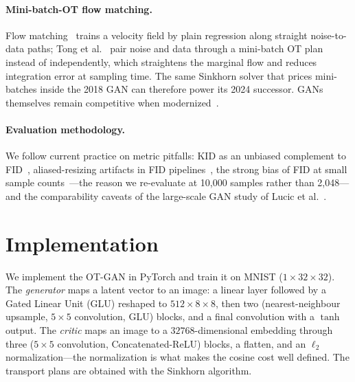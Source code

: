 \documentclass[10pt,twocolumn]{article}
\begin{document}
\paragraph{Mini-batch-OT flow matching.} Flow matching~\cite{lipman2023} trains a
velocity field by plain regression along straight noise-to-data paths; Tong et
al.~\cite{tong2024} pair noise and data through a mini-batch OT plan instead of
independently, which straightens the marginal flow and reduces integration error at
sampling time. The same Sinkhorn solver that prices mini-batches inside the 2018 GAN can
therefore power its 2024 successor. GANs themselves remain competitive when
modernized~\cite{huang2024}.
\paragraph{Evaluation methodology.} We follow current practice on metric pitfalls: KID as
an unbiased complement to FID~\cite{binkowski2018}, aliased-resizing artifacts in FID
pipelines~\cite{parmar2022}, the strong bias of FID at small sample
counts~\cite{chong2020}---the reason we re-evaluate at 10{,}000 samples rather than
2{,}048---and the comparability caveats of the large-scale GAN study of Lucic et
al.~\cite{lucic2018}.

\section{Implementation}
We implement the OT-GAN in PyTorch and train it on MNIST ($1\times 32\times 32$). The
\emph{generator} maps a latent vector to an image: a linear layer followed by a Gated
Linear Unit (GLU) reshaped to $512\times 8\times 8$, then two (nearest-neighbour upsample,
$5\times 5$ convolution, GLU) blocks, and a final convolution with a $\tanh$ output. The
\emph{critic} maps an image to a $32768$-dimensional embedding through three ($5\times 5$
convolution, Concatenated-ReLU) blocks, a flatten, and an $\ell_2$ normalization---the
normalization is what makes the cosine cost well defined. The transport plans are obtained
with the Sinkhorn algorithm.
\end{document}
